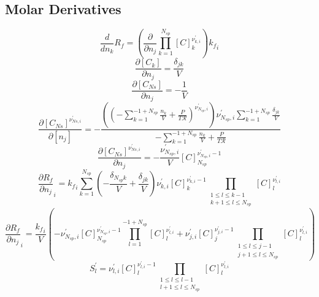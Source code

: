 \documentclass[a4paper,10pt]{article}
\newcommand{\ns}{N_{sp}}
\newcommand{\Ru}{\mathcal{R}}
\begin{document}
\subsection{Molar Derivatives}
\begin{dmath} \frac{d}{d n_{k}} {R_f} = \left(\frac{\partial}{\partial n_{j}} \prod_{k=1}^{\ns} [C]_{k}^{\nu^{\prime}_{k,i}}\right) {k_f}_{i}\end{dmath} 
\begin{dmath} \frac{\partial [C_k]}{\partial n_j} =\frac{\delta_{j k}}{V}\end{dmath} 
\begin{dmath} \frac{\partial [C_{Ns}]}{\partial n_j} =- \frac{1}{V}\end{dmath} 
\begin{dmath} \frac{\partial [C_{Ns}]^{\nu^{\prime}_{Ns, i}}}{\partial [n_j]} =- \frac{\left(\left(- \sum_{k=1}^{-1 + \ns} \frac{n_{k}}{V} + \frac{P}{T \Ru}\right)^{\nu^{\prime}_{\ns,i}}\right) \nu^{\prime}_{\ns,i} \sum_{k=1}^{-1 + \ns} \frac{\delta_{j k}}{V}}{- \sum_{k=1}^{-1 + \ns} \frac{n_{k}}{V} + \frac{P}{T \Ru}}\end{dmath} 
\begin{dmath} \frac{\partial [C_{Ns}]^{\nu^{\prime}_{Ns, i}}}{\partial n_j} =- \frac{\nu^{\prime}_{\ns,i}}{V} [C]_{\ns}^{\nu^{\prime}_{\ns,i} - 1}\end{dmath} 
\begin{dmath} \frac{\partial {R_f} }{\partial {n_j} }_{i} = {k_f}_{i} \sum_{k=1}^{\ns} \left(- \frac{\delta_{\ns k}}{V} + \frac{\delta_{j k}}{V}\right) \nu^{\prime}_{k,i} [C]_{k}^{\nu^{\prime}_{k,i} - 1} \prod_{\substack{1 \leq l \leq k - 1\\k + 1 \leq l \leq \ns}} [C]_{l}^{\nu^{\prime}_{l,i}}\end{dmath} 
\begin{dmath} \frac{\partial {R_f} }{\partial {n_j} }_{i} = \frac{{k_f}_{i}}{V} \left(- \nu^{\prime}_{\ns,i} [C]_{\ns}^{\nu^{\prime}_{\ns,i} - 1} \prod_{l=1}^{-1 + \ns} [C]_{l}^{\nu^{\prime}_{l,i}} + \nu^{\prime}_{j,i} [C]_{j}^{\nu^{\prime}_{j,i} - 1} \prod_{\substack{1 \leq l \leq j - 1\\j + 1 \leq l \leq \ns}} [C]_{l}^{\nu^{\prime}_{l,i}}\right)\end{dmath} 
\begin{dmath} S^{\prime}_{l} = \nu^{\prime}_{l,i} [C]_{l}^{\nu^{\prime}_{l,i} - 1} \prod_{\substack{1 \leq l \leq l - 1\\l + 1 \leq l \leq \ns}} [C]_{l}^{\nu^{\prime}_{l,i}}\end{dmath} 
\end{document}
